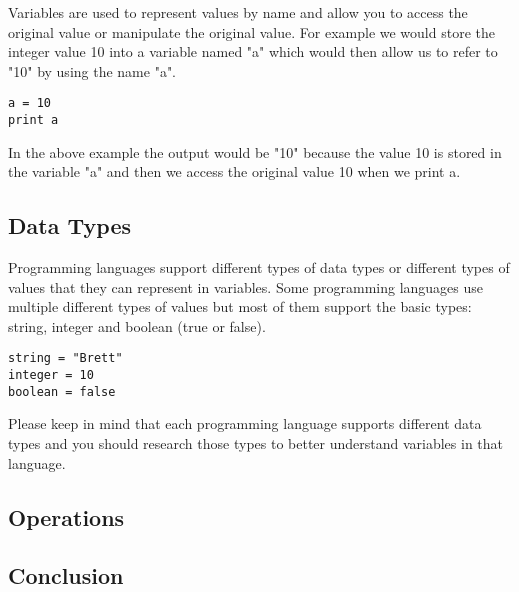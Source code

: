 Variables are used to represent values by name and allow you to access the original value or manipulate the original value.
For example we would store the integer value 10 into a variable named "a" which would then allow us to refer to "10" by
using the name "a". 

\begin{lstlisting}
a = 10
print a
\end{lstlisting}

In the above example the output would be "10" because the value 10 is stored in the variable "a" and then we access the original value
10 when we print a.

\subsection{Data Types}

Programming languages support different types of data types or different types of values that they can represent in variables.
Some programming languages use multiple different types of values but most of them support the basic types: string, integer
and boolean (true or false).

\begin{lstlisting}
string = "Brett"
integer = 10
boolean = false
\end{lstlisting}

Please keep in mind that each programming language supports different data types and you should research those types to better
understand variables in that language.

\subsection{Operations}

\subsection{Conclusion}
